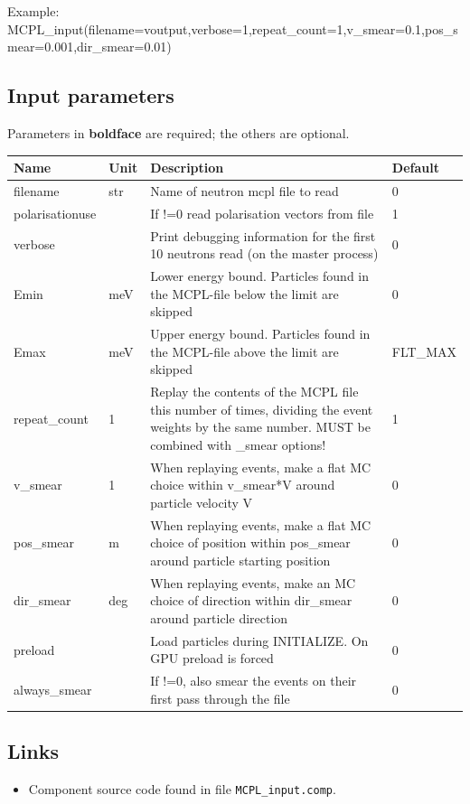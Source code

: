 Example: MCPL\_input(filename=voutput,verbose=1,repeat\_count=1,v\_smear=0.1,pos\_smear=0.001,dir\_smear=0.01)

\subsection*{Input parameters}
Parameters in \textbf{boldface} are required; the others are optional.

\begin{longtable}{p{}p{}p{}p{}}
\toprule
\textbf{Name} & \textbf{Unit} & \textbf{Description} & \textbf{Default} \\
\midrule
\endhead
filename & str & Name of neutron mcpl file to read & 0 \\
polarisationuse &   & If !=0 read polarisation vectors from file & 1 \\
verbose &   & Print debugging information for the first 10 neutrons read (on the master process) & 0 \\
Emin & meV & Lower energy bound. Particles found in the MCPL-file below the limit are skipped & 0 \\
Emax & meV & Upper energy bound. Particles found in the MCPL-file above the limit are skipped & FLT\_MAX \\
repeat\_count & 1 & Replay the contents of the MCPL file this number of times, dividing the event weights by the same number. MUST be combined with \_smear options! & 1 \\
v\_smear & 1 & When replaying events, make a flat MC choice within v\_smear*V around particle velocity V & 0 \\
pos\_smear & m & When replaying events, make a flat MC choice of position within pos\_smear around particle starting position & 0 \\
dir\_smear & deg & When replaying events, make an MC choice of direction within dir\_smear around particle direction & 0 \\
preload &   & Load particles during INITIALIZE. On GPU preload is forced & 0 \\
always\_smear &   & If !=0, also smear the events on their first pass through the file & 0 \\
\bottomrule
\end{longtable}

\subsection*{Links}
\begin{itemize}
  \item Component source code found in file \texttt{MCPL\_input.comp}.
\end{itemize}
